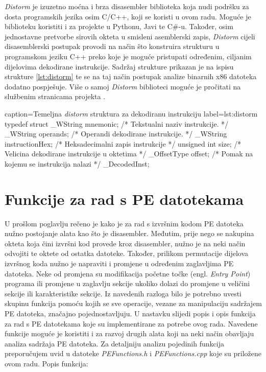\documentclass[times, utf8, diplomski, numeric]{fer}
\begin{document}
\emph{Distorm} je izuzetno moćna i brza disasembler biblioteka
koja nudi podršku za dosta programskih jezika osim C/C++, koji
se koristi u ovom radu. Moguće		%
je biblioteku koristiti i za projekte u Pythonu, Javi te C\#-u.
Također, osim jednostavne pretvorbe sirovih okteta u smisleni
asemblerski zapis, \emph{Distorm} cijeli disasemblerski postupak			%
provodi na način što konstruira strukturu u programskom jeziku
C++ preko koje je moguće pristupati određenim, ciljanim
dijelovima dekodirane instrukcije. Sadržaj strukture prikazan je
na ispisu strukture \ref{lst:distorm} te se na taj način postupak
analize binarnih x86 datoteka dodatno pospješuje. Više o samoj
\emph{Distorm} biblioteci moguće je pročitati na službenim
stranicama projekta \citep{distorm}. 						%

\begin{struktura} {caption=Temeljna \emph{distorm} struktura za dekodiranu instrukciju} {label=lst:distorm}
typedef struct {
	_WString mnemonic; /* Tekstualni naziv instrukcije. */
	_WString operands; /* Operandi dekodirane instrukcije. */
	_WString instructionHex; /* Heksadecimalni zapis instrukcije */
	unsigned int size; /* Velicina dekodirane instrukcije u oktetima */
	_OffsetType offset; /* Pomak na kojemu se instrukcija nalazi */
} _DecodedInst;
\end{struktura}

\section{Funkcije za rad s PE datotekama}

U prošlom poglavlju rečeno je kako je za rad s izvršnim kodom PE
datoteka nužno postojanje alata kao što je disasembler. Međutim,
prije nego se nakupina okteta koja čini izvršni kod provede kroz
disasembler, nužno je na neki način odvojiti te oktete od ostatka
datoteke. Također, prilikom permutacije dijelova izvršnog koda
nužno je napraviti i promjene u određenim zaglavljima PE
datoteka. Neke od promjena su modifikacija početne točke (engl. 
\emph{Entry Point}) programa ili promjene u zaglavlju sekcije
ukoliko dolazi do promjene u veličini sekcije ili karakteristike
sekcije. Iz navedenih razloga bilo je potrebno uvesti skupinu
funkcija pomoću kojih se sve operacije, vezane za manipulaciju
sadržajem PE datoteka, značajno pojednostavljuju. U nastavku
slijedi popis i opis funkcija za rad s PE datotekama koje su
implementirane za potrebe ovog rada. Navedene funkcije moguće je
koristiti i za razvoj drugih alata koji na neki način obavljaju
analiza sadržaja PE datoteka. Za detaljniju analizu
pojedinih funkcija preporučujem uvid u datoteke
\emph{PEFunctions.h} i \emph{PEFunctions.cpp} koje su priložene
ovom radu. Popis funkcija:
\end{document}
